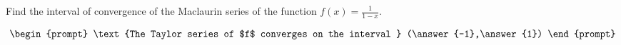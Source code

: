 \documentclass{ximera}
\author{Gregory Hartman \and Matthew Carr}
\begin{document}
\begin{exercise}






Find the interval of convergence of the Maclaurin series of the function $f(x)=\frac{1}{1-x}$.

\[
\begin{prompt}
\text{The Taylor series of $f$ converges on the interval } (\answer{-1},\answer{1})
\end{prompt}
\]

\end{exercise}
\end{document}
